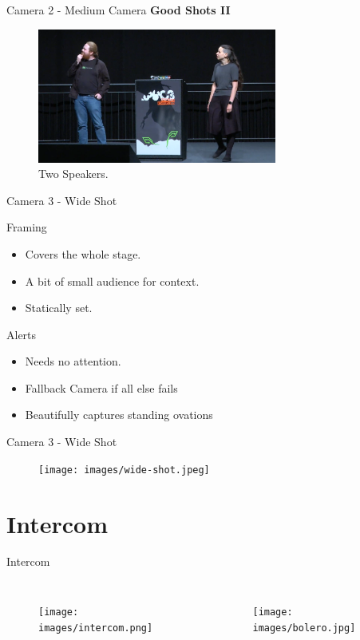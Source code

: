 \documentclass[aspectratio=169]{beamer}
\begin{document}
\begin{frame}{Camera 2 - Medium Camera}
	\textbf{Good Shots II}
	\begin{figure} 
		\centering
		\includegraphics[width=0.7\textwidth]{images/medium2.png}
		\caption{Two Speakers.}
	\end{figure}
\end{frame}

\begin{frame}{Camera 3 - Wide Shot}
		\begin{block}{Framing}
			\begin{itemize}
				\item Covers the whole stage.
				\item A bit of small audience for context.
				\item Statically set.
			\end{itemize}
		\end{block}

		\begin{alertblock}{Alerts}
			\begin{itemize}
				\item Needs no attention. 
				\item Fallback Camera if all else fails 
				\item Beautifully captures standing ovations
			\end{itemize}
		\end{alertblock}
\end{frame}

\begin{frame}{Camera 3 - Wide Shot}
	\begin{figure} 
		\centering
		\texttt{[image: images/wide-shot.jpeg]}
	\end{figure}
\end{frame}

\section{Intercom} %
 \begin{frame}{Intercom}
	\begin{columns}[T,onlytextwidth]
		\begin{figure} 
		\centering
		\def\svgwidth{1\textwidth}
		\texttt{[image: images/intercom.png]} 
		\end{figure}
	\begin{figure} 
		\centering
		\def\svgwidth{1\textwidth}
		\texttt{[image: images/bolero.jpg]} 
	\end{figure}
	\end{columns}
\end{frame}
\end{document}
